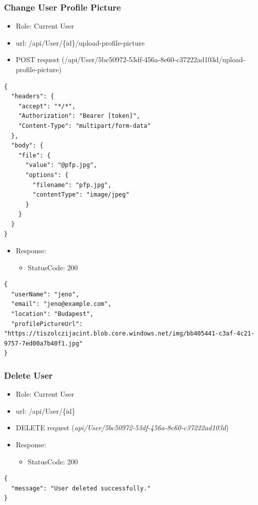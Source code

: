 \documentclass[11pt]{article}
\begin{document}
\subsubsection{Change User Profile Picture}
\label{sec:org091bbf7}
\begin{itemize}
\item Role: Current User
\item url: /api/User/\{id\}/upload-profile-picture
\item POST request (/api/User/5bc50972-53df-456a-8e60-c37222ad103d/upload-profile-picture)
\end{itemize}
\begin{verbatim}
{
  "headers": {
    "accept": "*/*",
    "Authorization": "Bearer [token]",
    "Content-Type": "multipart/form-data"
  },
  "body": {
    "file": {
      "value": "@pfp.jpg",
      "options": {
        "filename": "pfp.jpg",
        "contentType": "image/jpeg"
      }
    }
  }
}
\end{verbatim}
\begin{itemize}
\item Response:
\begin{itemize}
\item StatusCode: 200
\end{itemize}
\end{itemize}
\begin{verbatim}
{
  "userName": "jeno",
  "email": "jeno@example.com",
  "location": "Budapest",
  "profilePictureUrl": "https://tiszolczijacint.blob.core.windows.net/img/bb405441-c3af-4c21-9757-7ed00a7b40f1.jpg"
}
\end{verbatim}
\subsubsection{Delete User}
\label{sec:orgb217a9b}
\begin{itemize}
\item Role: Current User
\item url: /api/User/\{id\}
\item DELETE request (\emph{api/User/5bc50972-53df-456a-8e60-c37222ad103d})
\item Response:
\begin{itemize}
\item StatusCode: 200
\end{itemize}
\end{itemize}
\begin{verbatim}
{
  "message": "User deleted successfully."
}
\end{verbatim}
\end{document}
